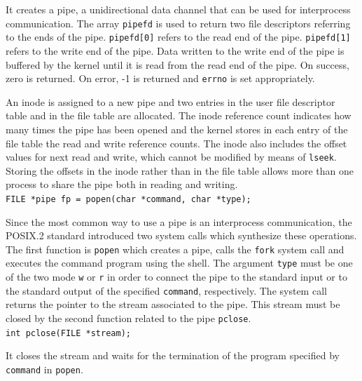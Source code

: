 It creates a pipe, a unidirectional data channel that can be used for interprocess communication. The array \texttt{pipefd} is used to return two file descriptors referring to the ends of the pipe. \texttt{pipefd[0]} refers to the read end of the pipe. \texttt{pipefd[1]} refers to the write end of the pipe. Data written to the write end of the pipe is buffered by the kernel until it is read from the read end of the pipe. On success, zero is returned. On error, -1 is returned and \texttt{errno} is set appropriately.

An inode is assigned to a new pipe and two entries in the user file descriptor table and in the file table are allocated. The inode reference count indicates how many times the pipe has been opened and the kernel stores in each entry of the file table the read and write reference counts. The inode also includes the offset values for next read and write, which cannot be modified by means of \texttt{lseek}. Storing the offsets in the inode rather than in the file table allows more than one process to share the pipe both in reading and writing.
\\
\texttt{FILE *pipe fp = popen(char *command, char *type);}

Since the most common way to use a pipe is an interprocess communication, the POSIX.2 standard introduced two system calls which synthesize these operations. The first function is \texttt{popen} which creates a pipe, calls the \texttt{fork} system call and executes the command program using the shell. The argument \texttt{type} must be one of the two mode \texttt{w} or \texttt{r} in order to connect the pipe to the standard input or to the standard output of the specified \texttt{command}, respectively. The system call returns the pointer to the stream associated to the pipe. This stream must be closed by the second function related to the pipe \texttt{pclose}.
\\
\texttt{int pclose(FILE *stream);}

It closes the stream and waits for the termination of the program specified by \texttt{command} in \texttt{popen}.

